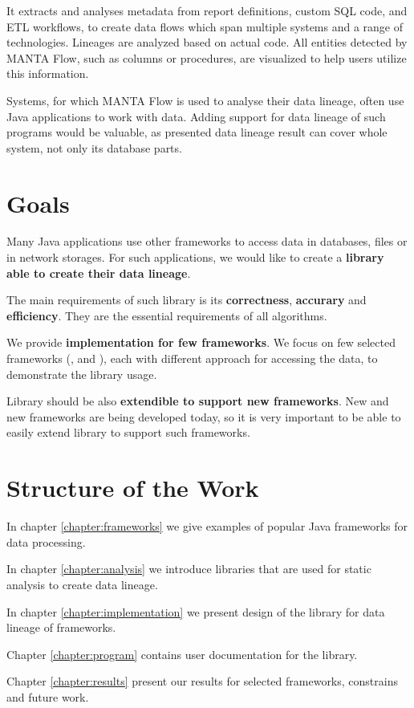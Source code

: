 It extracts and analyses metadata from report definitions,
custom SQL code, and ETL workflows, to create data flows
which span multiple systems and a range of technologies.
Lineages are analyzed based on actual code.
All entities detected by MANTA Flow, such as columns or procedures,
are visualized to help users utilize this information.

Systems, for which MANTA Flow is used to analyse their data lineage,
often use Java applications to work with data. Adding support
for data lineage of such programs would be valuable,
as presented data lineage result can cover whole system,
not only its database parts.




\section{Goals}

Many Java applications use other frameworks to access data
in databases, files or in network storages.
For such applications, we would like to create a \textbf{library
able to create their data lineage}.

The main requirements of such library is its
\textbf{correctness}, \textbf{accurary} and \textbf{efficiency}.
They are the essential requirements of all algorithms.

We provide \textbf{implementation for few frameworks}.
We focus on few selected frameworks (\citet{MyBatis}, \citet{SpringJDBC} and \citet{Kafka}),
each with different approach for accessing the data, to demonstrate the library usage.

Library should be also \textbf{extendible to support new frameworks}.
New and new frameworks are being developed today, so it is very important
to be able to easily extend library to support such frameworks.



\section{Structure of the Work}

In chapter \ref{chapter:frameworks} we give examples of popular Java frameworks
for data processing.

In chapter \ref{chapter:analysis} we introduce libraries that are used
for static analysis to create data lineage.

In chapter \ref{chapter:implementation} we present design of the library for
data lineage of frameworks.

Chapter \ref{chapter:program} contains user documentation for the library.

Chapter \ref{chapter:results} present our results for selected frameworks,
constrains and future work.



